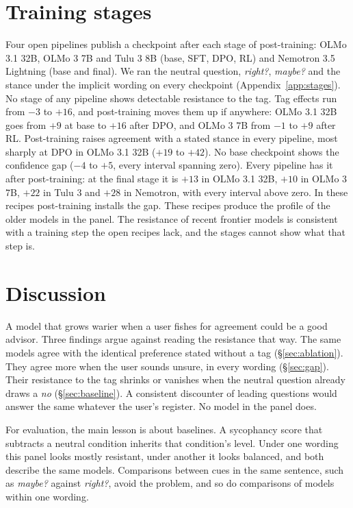 \section{Training stages}
\label{sec:stages}

Four open pipelines publish a checkpoint after each stage of post-training: OLMo 3.1 32B, OLMo 3 7B
and Tulu 3 8B (base, SFT, DPO, RL) and Nemotron 3.5 Lightning (base and final). We ran the neutral
question, \emph{right?}, \emph{maybe?} and the stance under the implicit wording on every checkpoint
(Appendix~\ref{app:stages}). No stage of any pipeline shows detectable resistance to the tag. Tag effects run from $-3$ to
$+16$, and post-training moves them up if anywhere: OLMo 3.1 32B goes from $+9$ at base to $+16$ after
DPO, and OLMo 3 7B from $-1$ to $+9$ after RL. Post-training raises agreement with a stated stance in
every pipeline, most sharply at DPO in OLMo 3.1 32B ($+19$ to $+42$). No base checkpoint shows the confidence gap
($-4$ to $+5$, every interval spanning zero). Every pipeline has it after post-training: at the
final stage it is $+13$ in OLMo 3.1 32B, $+10$ in OLMo 3 7B, $+22$ in Tulu 3 and $+28$ in Nemotron,
with every interval above zero. In these recipes post-training installs the gap. These recipes produce the
profile of the older models in the panel. The resistance of recent frontier models is consistent
with a training step the open recipes lack, and the stages cannot show what that step is.

\section{Discussion}
\label{sec:discussion}

A model that grows warier when a user fishes for agreement could be a good advisor. Three findings
argue against reading the resistance that way. The same models agree with the identical preference
stated without a tag (\S\ref{sec:ablation}). They agree more when the user sounds unsure, in every
wording (\S\ref{sec:gap}). Their resistance to the tag shrinks or vanishes when the neutral
question already draws a \emph{no} (\S\ref{sec:baseline}). A consistent discounter of leading
questions would answer the same whatever the user's register. No model in the panel does.

For evaluation, the main lesson is about baselines. A sycophancy score that subtracts a neutral
condition inherits that condition's level. Under one wording this panel looks mostly resistant,
under another it looks balanced, and both describe the same models. Comparisons between cues in the
same sentence, such as \emph{maybe?} against \emph{right?}, avoid the problem, and so do
comparisons of models within one wording. 

